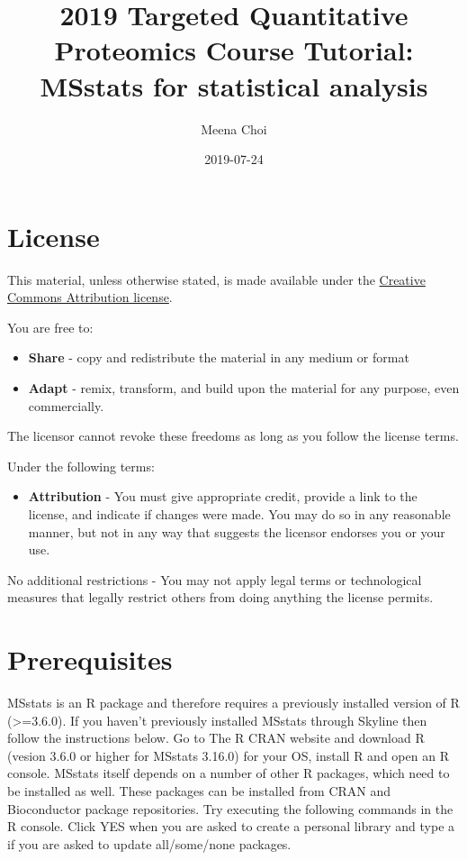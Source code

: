 \documentclass[]{book}
\title{2019 Targeted Quantitative Proteomics Course Tutorial: MSstats for statistical analysis}
\author{Meena Choi}
\date{2019-07-24}
\providecommand{\tightlist}{%
  \setlength{\itemsep}{0pt}\setlength{\parskip}{0pt}}
\begin{document}
\maketitle

{
\setcounter{tocdepth}{1}
\tableofcontents
}
\hypertarget{license}{%
\chapter*{License}\label{license}}

This material, unless otherwise stated, is made available under the
\href{https://creativecommons.org/licenses/by/4.0/}{Creative Commons Attribution
license}.

You are free to:

\begin{itemize}
\tightlist
\item
  \textbf{Share} - copy and redistribute the material in any medium or format
\item
  \textbf{Adapt} - remix, transform, and build upon the material for any
  purpose, even commercially.
\end{itemize}

The licensor cannot revoke these freedoms as long as you follow the license terms.

Under the following terms:

\begin{itemize}
\tightlist
\item
  \textbf{Attribution} - You must give appropriate credit, provide a link
  to the license, and indicate if changes were made. You may do so in
  any reasonable manner, but not in any way that suggests the licensor
  endorses you or your use.
\end{itemize}

No additional restrictions - You may not apply legal terms or
technological measures that legally restrict others from doing
anything the license permits.

\hypertarget{prerequisites}{%
\chapter{Prerequisites}\label{prerequisites}}

MSstats is an R package and therefore requires a previously installed version of R (\textgreater{}=3.6.0). If you haven't previously installed MSstats through Skyline then follow the instructions below.
Go to The R CRAN website and download R (vesion 3.6.0 or higher for MSstats 3.16.0) for your OS, install R and open an R console. MSstats itself depends on a number of other R packages, which need to be installed as well. These packages can be installed from CRAN and Bioconductor package repositories. Try executing the following commands in the R console. Click YES when you are asked to create a personal library and type a if you are asked to update all/some/none packages.
\end{document}
